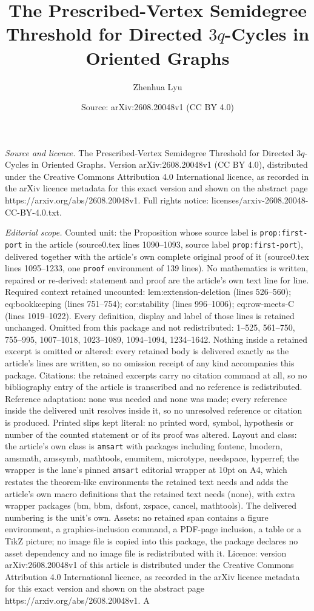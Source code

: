 \documentclass[10pt,a4paper]{amsart}
\title[The Prescribed-Vertex Semidegree Threshold for Directed $3q$]{The Prescribed-Vertex Semidegree Threshold for Directed $3q$-Cycles in Oriented Graphs}
\author{Zhenhua Lyu}
\date{Source: arXiv:2608.20048v1 (CC BY 4.0)}
\begin{document}
\maketitle

\noindent\emph{Source and licence.} The Prescribed-Vertex Semidegree Threshold for Directed $3q$-Cycles in Oriented Graphs. Version arXiv:2608.20048v1 (CC BY 4.0), distributed under the Creative Commons Attribution 4.0 International licence, as recorded in the arXiv licence metadata for this exact version and shown on the abstract page https://arxiv.org/abs/2608.20048v1. Full rights notice: licenses/arxiv-2608.20048-CC-BY-4.0.txt.\par\smallskip

\noindent\textit{Editorial scope.} Counted unit: the Proposition whose source label is \texttt{prop:first-port} in the article (source0.tex lines 1090--1093, source label \texttt{prop:first-port}), delivered together with the article's own complete original proof of it (source0.tex lines 1095--1233, one \texttt{proof} environment of 139 lines). No mathematics is written, repaired or re-derived: statement and proof are the article's own text line for line. Required context retained uncounted: lem:extension-deletion (lines 526--560); eq:bookkeeping (lines 751--754); cor:stability (lines 996--1006); eq:row-meets-C (lines 1019--1022). Every definition, display and label of those lines is retained unchanged. Omitted from this package and not redistributed: 1--525, 561--750, 755--995, 1007--1018, 1023--1089, 1094--1094, 1234--1642. Nothing inside a retained excerpt is omitted or altered: every retained body is delivered exactly as the article's lines are written, so no omission receipt of any kind accompanies this package. Citations: the retained excerpts carry no citation command at all, so no bibliography entry of the article is transcribed and no reference is redistributed. Reference adaptation: none was needed and none was made; every reference inside the delivered unit resolves inside it, so no unresolved reference or citation is produced. Printed slips kept literal: no printed word, symbol, hypothesis or number of the counted statement or of its proof was altered. Layout and class: the article's own class is \texttt{amsart} with packages including fontenc, lmodern, amsmath, amssymb, mathtools, enumitem, microtype, needspace, hyperref; the wrapper is the lane's pinned \texttt{amsart} editorial wrapper at 10pt on A4, which restates the theorem-like environments the retained text needs and adds the article's own macro definitions that the retained text needs (none), with extra wrapper packages (bm, bbm, dsfont, xspace, cancel, mathtools). The delivered numbering is the unit's own. Assets: no retained span contains a figure environment, a graphics-inclusion command, a PDF-page inclusion, a table or a TikZ picture; no image file is copied into this package, the package declares no asset dependency and no image file is redistributed with it. Licence: version arXiv:2608.20048v1 of this article is distributed under the Creative Commons Attribution 4.0 International licence, as recorded in the arXiv licence metadata for this exact version and shown on the abstract page https://arxiv.org/abs/2608.20048v1. A 
\end{document}
